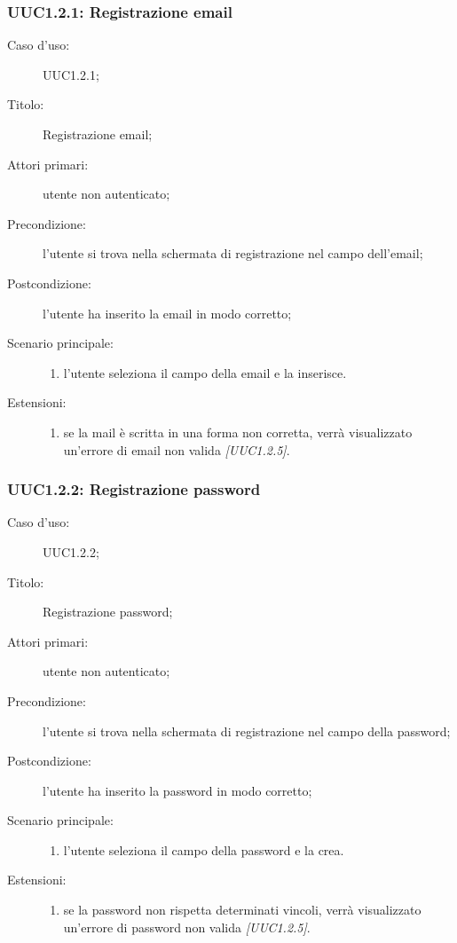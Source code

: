 \documentclass[components/casi-duso-app]{subfiles}
\begin{document}
\subsubsection{UUC1.2.1: Registrazione email}%
\label{subs:UUC1.2.1}
\begin{description}
  \item[Caso d’uso:] UUC1.2.1;
  \item[Titolo:] Registrazione email;
  \item[Attori primari:] utente non autenticato;
  \item[Precondizione:] l'utente si trova nella schermata di registrazione nel campo dell'email;
  \item[Postcondizione:] l'utente ha inserito la email in modo corretto;
  \item[Scenario principale:]
  \begin{enumerate}
    \item l'utente seleziona il campo della email e la inserisce.
  \end{enumerate}
  \item[Estensioni:]
  \begin{enumerate}
    \item se la mail è scritta in una forma non corretta, verrà visualizzato un'errore di email non valida \emph{[UUC1.2.5]}.
  \end{enumerate}
\end{description}



\subsubsection{UUC1.2.2: Registrazione password}%
\label{subs:UUC1.2.2}
\begin{description}
  \item[Caso d’uso:] UUC1.2.2;
  \item[Titolo:] Registrazione password;
  \item[Attori primari:] utente non autenticato;
  \item[Precondizione:] l'utente si trova nella schermata di registrazione nel campo della password;
  \item[Postcondizione:] l'utente ha inserito la password in modo corretto;
  \item[Scenario principale:]
  \begin{enumerate}
    \item l'utente seleziona il campo della password e la crea.
  \end{enumerate}
  \item[Estensioni:]
  \begin{enumerate}
    \item se la password non rispetta determinati vincoli, verrà visualizzato un'errore di password non valida \emph{[UUC1.2.5]}.
  \end{enumerate}
\end{description}
\end{document}
